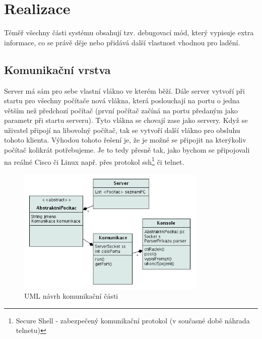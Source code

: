 \chapter{Realizace} \label{realizace}


Téměř všechny části systému obsahují tzv. debugovací mód, který vypisuje extra informace, co se právě děje nebo přidává další vlastnost vhodnou pro ladění.

\section{Komunikační vrstva}
Server má sám pro sebe vlastní vlákno ve kterém běží. Dále server vytvoří při startu pro všechny počítače nová vlákna, která poslouchají na portu o jedna větším než předchozí počítač (první počítač začíná na portu předaným jako parametr při startu serveru). Tyto vlákna se chovají zase jako servery. Když se uživatel připojí na libovolný počítač, tak se vytvoří další vlákno pro obsluhu tohoto klienta. Výhodou tohoto řešení je, že je možné se připojit na kterýkoliv počítač kolikrát potřebujeme. Je to tedy přesně tak, jako bychom se připojovali na reálné Cisco či Linux např. přes protokol ssh\footnote{Secure Shell - zabezpečený komunikační protokol (v současné době náhrada telnetu)} či telnet.

\begin{figure}[h]
\begin{center}
\includegraphics[width=9cm]{figures/uml_sit}
\caption{UML návrh komunikační části}
\label{uml:sit}
\end{center}
\end{figure}

